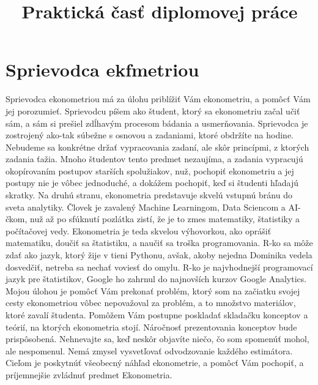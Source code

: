 \makeatletter
\def\maxwidth{\ifdim\Gin@nat@width>\linewidth\linewidth\else\Gin@nat@width\fi}
\def\maxheight{\ifdim\Gin@nat@height>\textheight\textheight\else\Gin@nat@height\fi}
\makeatother

\title{Praktická časť diplomovej práce}
\author{}
\date{\vspace{-2.5em}}



\maketitle

\hypertarget{sprievodca-ekfmetriou}{%
\section{Sprievodca ekfmetriou}\label{sprievodca-ekfmetriou}}

Sprievodca ekonometriou má za úlohu priblížiť Vám ekonometriu, a pomôcť
Vám jej porozumieť. Sprievodcu píšem ako študent, ktorý sa ekonometriu
začal učiť sám, a sám si prešiel zdĺhavým procesom bádania a
usmerňovania. Sprievodca je zostrojený ako-tak súbežne s osnovou a
zadaniami, ktoré obdržíte na hodine. Nebudeme sa konkrétne držať
vypracovania zadaní, ale skôr princípmi, z ktorých zadania ťažia. Mnoho
študentov tento predmet nezaujíma, a zadania vypracujú okopírovaním
postupov starších spolužiakov, nuž, pochopiť ekonometriu a jej postupy
nie je vôbec jednoduché, a dokážem pochopiť, keď si študenti hľadajú
skratky. Na druhú stranu, ekonometria predstavuje skvelú vstupnú bránu
do sveta analytiky. Človek je zavalený Machine Learningom, Data Sciencom
a AI-čkom, nuž až po sfúknutí pozlátka zistí, že je to zmes matematiky,
štatistiky a počítačovej vedy. Ekonometria je teda skvelou výhovorkou,
ako oprášiť matematiku, doučiť sa štatistiku, a naučiť sa troška
programovania. R-ko sa môže zdať ako jazyk, ktorý žije v tieni Pythonu,
avšak, akoby nejedna Dominika vedela dosvedčiť, netreba sa nechať
voviesť do omylu. R-ko je najvhodnejší programovací jazyk pre
štatistikov, Google ho zahrnul do najnovších kurzov Google Analytics.
Mojou úlohou je pomôcť Vám prekonať problém, ktorý som na začiatku
svojej cesty ekonometriou vôbec nepovažoval za problém, a to množstvo
materiálov, ktoré zavalí študenta. Pomôžem Vám postupne poskladať skladačku
konceptov a teórií, na ktorých ekonometria stojí. Náročnosť
prezentovania konceptov bude prispôsobená. Nehnevajte sa, keď neskôr
objavíte niečo, čo som spomenúť mohol, ale nespomenul. Nemá zmysel
vysvetľovať odvodzovanie každého estimátora. Cieľom je poskytnúť
všeobecný náhľad ekonometrie, a pomôcť Vám pochopiť, a príjemnejšie
zvládnuť predmet Ekonometria.


